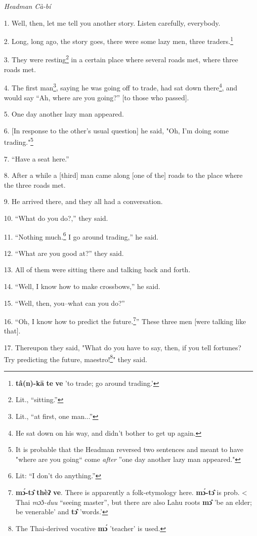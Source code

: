 \setcounter{footnote}{0}

\textit{Headman Cà-bí}

1. Well, then, let me tell you another story. Listen carefully, everybody.

2. Long, long ago, the story goes, there were some lazy men, three traders.\footnote{\textbf{tâ(n)-kā} \textbf{te} \textbf{ve} 'to trade; go around trading.'}

3. They were resting\footnote{Lit., ``sitting.''} in a certain place where several roads met, where three
roads met.

4. The first man\footnote{Lit., ``at first, one man...''}, saying he was going off to trade, had sat down there\footnote{He sat down on his way, and didn't bother to get up again.},
and would say ``Ah, where are you going?'' [to those who passed].

5. One day another lazy man appeared.

6. [In response to the other's usual question] he said, "Oh, I'm doing
some trading."\footnote{It is probable that the Headman reversed two sentences and meant to have "where are you going`` come \textit{after} ''one day another lazy man appeared."}

7. ``Have a seat here.''

8. After a while a [third] man came along [one of the] roads to the place where
the three roads met.

9. He arrived there, and they all had a conversation.

10. ``What do you do?,'' they said.

11. ``Nothing much.\footnote{Lit: ``I don't do anything.''} I go around trading,'' he said.

12. ``What are you good at?'' they said.

13. All of them were sitting there and talking back and forth.

14. ``Well, I know how to make crossbows,'' he said.

15. ``Well, then, you--what can you do?''

16. ``Oh, I know how to predict the future.\footnote{\textbf{mɔ́-tɔ̂} \textbf{thèʔ} \textbf{ve}. There is apparently a folk-etymology here. \textbf{mɔ́-tɔ̂} is prob. < Thai \textit{mɔ̌ɔ-duu} ``seeing master'', but there are also Lahu roots \textbf{mɔ̂} 'be an elder; be venerable' and \textbf{tɔ̂} 'words.'}'' These three men
[were talking like that].

17. Thereupon they said, "What do you have to say, then, if you tell fortunes?
Try predicting the future, maestro!\footnote{The Thai-derived vocative \textbf{mɔ́} 'teacher' is used.}" they said.

